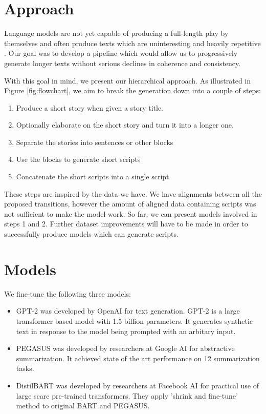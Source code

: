 \documentclass[11pt,a4paper]{article}
\begin{document}
\section{Approach}
Language models are not yet capable of producing a full-length play by themselves \citep{theaitre} and often produce texts which are uninteresting and heavily repetitive \citep{see-etal-2019-massively}. Our goal was to develop a pipeline which would allow us to progressively generate longer texts without serious declines in coherence and consistency.

With this goal in mind, we present our hierarchical approach. As illustrated in Figure \ref{fig:flowchart}, we aim to break the generation down into a couple of steps:
\begin{enumerate}
    \item Produce a short story when given a story title.
    \item Optionally elaborate on the short story and turn it into a longer one.
    \item Separate the stories into sentences or other blocks
    \item Use the blocks to generate short scripts
    \item Concatenate the short scripts into a single script
\end{enumerate}
These steps are inspired by the data we have. We have alignments between all the proposed transitions, however the amount of aligned data containing scripts was not sufficient to make the model work. So far, we can present models involved in steps 1 and 2. Further dataset improvements will have to be made in order to successfully produce models which can generate scripts.



\section{Models}
\label{sec:models}

We fine-tune the following three models: 
\begin{itemize}
    \item GPT-2 \citep{radford2019language}  was developed by OpenAI for text generation. GPT-2 is a large transformer based model with 1.5 billion parameters. It generates synthetic text in response to the model being prompted with an arbitary input. 
    \item PEGASUS \citep{zhang2019PEGASUS} was developed by researchers at Google AI for abstractive summarization. It achieved state of the art performance on 12 summarization tasks.
    \item DistilBART \citep{distilbart} was developed by researchers at Facebook AI for practical use of large scare pre-trained transformers. They apply 'shrink and fine-tune' method to original BART \citep{bart2019} and PEGASUS.    
\end{itemize}
\end{document}
